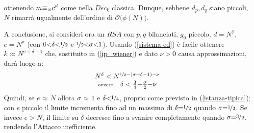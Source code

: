 \documentclass[twoside,symmetric,justified,openany,nobib]{tufte-book}
\begin{document}
\noindent
ottenendo $m {\equiv_{\text{\tiny $N$}}} c^d$ come nella $Dec_k$ classica. Dunque, sebbene $d_p,d_q$ siano piccoli, $N$ rimarrà ugualmente dell'ordine di $\mathcal{O}\bigl(\phi(N)\bigr)$.

A conclusione, si consideri ora un $RSA$ con $p,q$ bilanciati, $g_0$ piccolo, $d{=}N^\delta$, $e{=}N^\sigma$ (con $0{<}\delta{<}\nicefrac{1}{2}$ e $\nicefrac{1}{2}{<}\sigma{<}1$). Usando (\ref{sistema-ed}) è facile ottenere $k\hspace{1pt}{\approx}\hspace{1pt}N^{\sigma+\delta-1}$ che, sostituito in (\ref{ip_wiener}) e dato $\nu{>}0$ causa approssimazioni, darà luogo a:
\begin{equation*}
  \begin{array}{c}
    N^\delta < N^{\nicefrac{1}{2}-(\sigma+\delta-1)-\nu}\\
    \text{\scriptsize ovvero}\hspace{10pt} \delta < \frac{3}{4}{-}\frac{\sigma}{2}{-}\nu
  \end{array}
\end{equation*}
Quindi, se $e\hspace{1pt}{\approx}\hspace{1pt}N$ allora $\sigma\hspace{1pt}{\approx}\hspace{1pt}1$ e $\delta{<}\nicefrac{1}{4}$, proprio come previsto in (\ref{istanza-tipica}); con $e$ piccolo il limite incrementa fino ad un massimo di $\delta{=}\nicefrac{1}{2}$ quando $\sigma{=}\nicefrac{1}{2}$. Se invece $e{>}N$, il limite su $\delta$ decresce fino a svanire completamente quando $\sigma{=}\nicefrac{3}{2}$, rendendo l'Attacco inefficiente.

\end{document}
